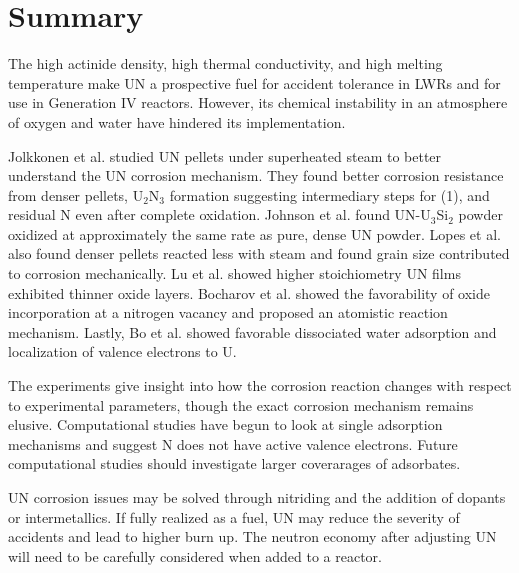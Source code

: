 \documentclass[11pt]{article}
\begin{document}
\section{Summary}
The high actinide density, high thermal conductivity, and high melting temperature make UN a prospective fuel for accident tolerance in LWRs and for use in Generation IV reactors. However, its chemical instability in an atmosphere of oxygen and water have hindered its implementation. 
\par Jolkkonen et al. \cite{Jolkkonen2017} studied UN pellets under superheated steam to better understand the UN corrosion mechanism. They found better corrosion resistance from denser pellets, U$_{2}$N$_{3}$ formation suggesting intermediary steps for (1), and residual N even after complete oxidation. Johnson et al. \cite{Johnson2016} found UN-U$_{3}$Si$_{2}$ powder oxidized at approximately the same rate as pure, dense UN powder. Lopes et al. \cite{Lopes2017} also found denser pellets reacted less with steam and found grain size contributed to corrosion mechanically. Lu et al. showed higher stoichiometry UN films exhibited thinner oxide layers. Bocharov et al. \cite{Bocharov2013} showed the favorability of oxide incorporation at a nitrogen vacancy and proposed an atomistic reaction mechanism. Lastly, Bo et al. \cite{Bo2016} showed favorable dissociated water adsorption and localization of valence electrons to U.
\par The experiments give insight into how the corrosion reaction changes with respect to experimental parameters, though the exact corrosion mechanism remains elusive. Computational studies have begun to look at single adsorption mechanisms and suggest N does not have active valence electrons. Future computational studies should investigate larger coverarages of adsorbates. 
\par UN corrosion issues may be solved through nitriding and the addition of dopants or intermetallics. If fully realized as a fuel, UN may reduce the severity of accidents and lead to higher burn up. The neutron economy after adjusting UN will need to be carefully considered when added to a reactor.













\end{document}
